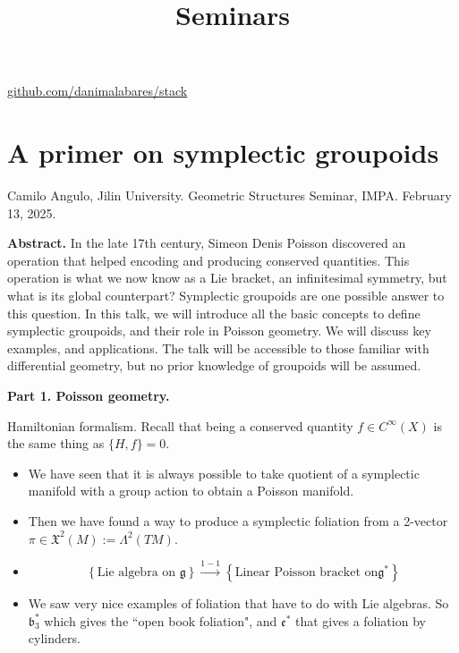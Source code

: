



\title{Seminars}
\maketitle

\label{section-phantom}
\hfill
\href{http://github.com/danimalabares/stack}{github.com/danimalabares/stack}

\tableofcontents

\section{A primer on symplectic groupoids}
\label{section-a-primer-on-symplectic-groupoids}

\noindent
Camilo Angulo, Jilin University.
Geometric Structures Seminar, IMPA. 
February 13, 2025.

\medskip
{\bf Abstract.} 
In the late 17th century, Simeon Denis Poisson discovered an operation that
helped encoding and producing conserved quantities. This operation is what we
now know as a Lie bracket, an infinitesimal symmetry, but what is its global
counterpart? Symplectic groupoids are one possible answer to this question. In
this talk, we will introduce all the basic concepts to define symplectic
groupoids, and their role in Poisson geometry. We will discuss key examples, and
applications. The talk will be accessible to those familiar with differential
geometry, but no prior knowledge of groupoids will be assumed.  


\medskip\noindent
{\bf Part 1. Poisson geometry.}

Hamiltonian formalism. Recall that being a conserved quantity \(f \in
C^\infty(X)\) is the same thing as \(\{H,f\}=0\).

\begin{itemize} \item We have seen that it is always possible to take quotient
of a symplectic manifold with a group action to obtain a  Poisson
manifold.  \item Then we have found a way to produce a symplectic foliation
from a 2-vector \(\pi \in \mathfrak{X}^2(M):=\Lambda^{2}(TM)\).  \item

\begin{remark}
\[\left\{ \text{Lie algebra on \(\mathfrak{g}\)}
\right\} \xrightarrow{1-1}\left\{ \text{Linear Poisson bracket on
\(\mathfrak{g}^*\)}  \right\}  \]
\end{remark} 

\item We saw very nice examples
of foliation that have to do with Lie algebras. So \(\mathfrak{b}^*_3\) which
gives the ``open book foliation", and \(\mathfrak{e}^*\) that gives a foliation
by cylinders.
\end{itemize}

